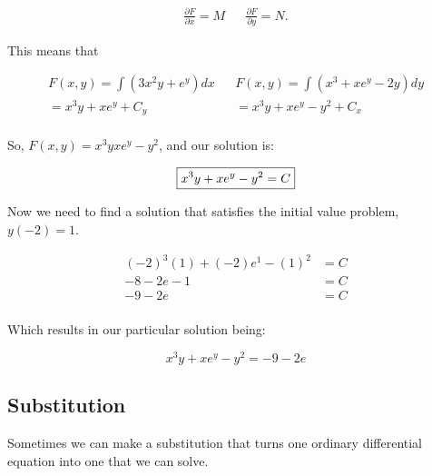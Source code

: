 \begin{problem}
    \begin{align*}
      \frac{\partial F}{\partial x}=M && \frac{\partial F}{\partial y}=N.
      \end{align*}

      This means that 

      \begin{align*}
        F(x,y)=\int(3x^2y+e^y)dx && F(x,y)=\int(x^3+xe^y-2y)dy\\
        =x^3y+xe^y+C_y && =x^3y+xe^y-y^2+C_x\\
      \end{align*}

      So, $F(x,y)=x^3yxe^y-y^2$, and our solution is:

      \[
        \boxed{x^3y+xe^y-y^2=C}\\
      \]

      Now we need to find a solution that satisfies the initial value problem, $y(-2)=1$.
      
      \begin{align*}
        (-2)^3(1)+(-2)e^1-(1)^2&=C\\
        -8-2e-1&=C\\
        -9-2e&=C\\
      \end{align*}

      Which results in our particular solution being:

      \[
        \boxed{x^3y+xe^y-y^2=-9-2e}
      \]
    \end{problem}

  \subsection{Substitution}
    Sometimes we can make a substitution that turns one ordinary differential equation into one that we can solve.
    
